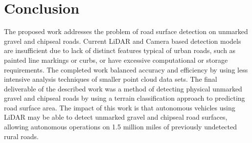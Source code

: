 \documentclass[journal,onecolumn]{IEEEtran}
\begin{document}
\section{Conclusion}
	
	{The proposed work addresses the problem of road surface detection on unmarked gravel and chipseal roads. Current LiDAR and Camera based detection models are insufficient due to lack of distinct features typical of urban roads, such as painted line markings or curbs, or have excessive computational or storage requirements. The completed work balanced accuracy and efficiency by using less intensive analysis techniques of smaller point cloud data sets. The final deliverable of the described work was a method of detecting physical unmarked gravel and chipseal roads by using a terrain classification approach to predicting road surface area. The impact of this work is that autonomous vehicles using LiDAR may be able to detect unmarked gravel and chipseal road surfaces, allowing autonomous operations on 1.5 million miles of previously undetected rural roads.}


%
\IEEEpeerreviewmaketitle





%
\end{document}
